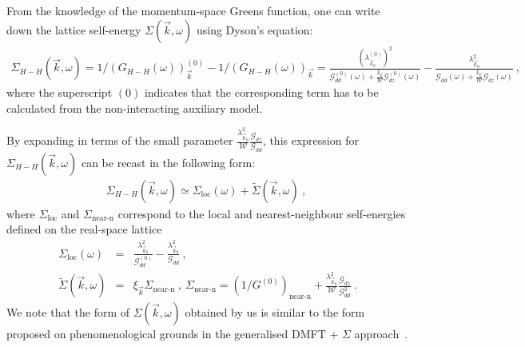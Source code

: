 \documentclass[prb]{revtex4-2}
\begin{document}
From the knowledge of the momentum-space Greens function, one can write down the lattice self-energy \(\Sigma(\vec k,\omega)\) using Dyson's equation:
\begin{equation}\begin{aligned}
	\label{self-energy1}
	\Sigma_{H-H}(\vec k,\omega) = 1/\left(G_{H-H}(\omega)\right)_{\vec k}^{(0)} - 1/\left(G_{H-H}(\omega)\right)_{\vec k} = \frac{\left(\lambda_{\vec k_0}^{(0)}\right)^2}{\mathcal{G}^{(0)}_{dd}(\omega) + \frac{\xi_{\vec k}}{\mathcal{W}}\mathcal{G}^{(0)}_{dz}(\omega)} - \frac{\lambda_{\vec k_0}^2}{\mathcal{G}_{dd}(\omega) + \frac{\xi_{\vec k}}{\mathcal{W}}\mathcal{G}_{dz}(\omega)}~,
\end{aligned}\end{equation}
where the superscript \((0)\) indicates that the corresponding term has to be calculated from the non-interacting auxiliary model. 

By expanding in terms of the small parameter $\frac{\lambda_{\vec k_0}^2}{\mathcal{W}}\frac{\mathcal{G}_{dz}}{\mathcal{G}_{dd}}$, this expression for $\Sigma_{H-H}(\vec k,\omega)$ can be recast in the following form:
\begin{equation}\begin{aligned}
	\Sigma_{H-H}(\vec k, \omega) \simeq \Sigma_\text{loc}(\omega) + \tilde{\Sigma}(\vec k, \omega)~,~\label{selfenergy1}
\end{aligned}\end{equation}
where $\Sigma_\text{loc}$ and $\Sigma_\text{near-n}$ correspond to the local and nearest-neighbour self-energies defined on the real-space lattice 
\begin{eqnarray}
\Sigma_\text{loc}(\omega) &=& \frac{\lambda_{\vec k_0}^2}{\mathcal{G}_{dd}^{(0)}} - \frac{\lambda_{\vec k_0}^2}{\mathcal{G}_{dd}}~,\\ 
\tilde{\Sigma}(\vec k, \omega)&=&\xi_{\vec k}\Sigma_\text{near-n}~,~\Sigma_\text{near-n} = \left(1/G^{(0)}\right)_\text{near-n} + \frac{\lambda_{\vec k_0}^2}{\mathcal{W}}\frac{\mathcal{G}_{dz}}{\mathcal{G}_{dd}^2}~.
\end{eqnarray}
We note that the form of $\Sigma(\vec k, \omega)$ obtained by us is similar to the form proposed on phenomenological grounds in the generalised DMFT + $\Sigma$ approach~\cite{sadovskii2012}.
\end{document}
